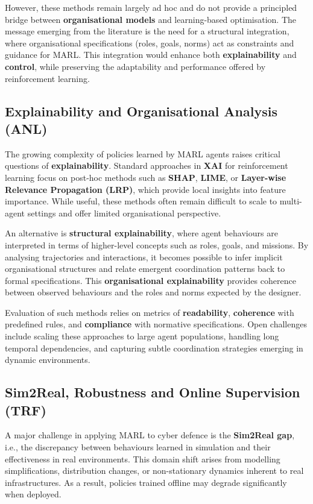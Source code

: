 \documentclass[a4paper,10pt,twocolumn]{article}
\begin{document}
However, these methods remain largely ad hoc and do not provide a
principled bridge between \textbf{organisational models} and
learning-based optimisation. The message emerging from the literature
is the need for a structural integration, where organisational
specifications (roles, goals, norms) act as constraints and guidance
for MARL. This integration would enhance both \textbf{explainability}
and \textbf{control}, while preserving the adaptability and performance
offered by reinforcement learning.

\subsection{Explainability and Organisational Analysis (ANL)}

The growing complexity of policies learned by MARL agents raises
critical questions of \textbf{explainability}. Standard approaches in
\textbf{XAI} for reinforcement learning focus on post-hoc methods such
as \textbf{SHAP}, \textbf{LIME}, or \textbf{Layer-wise Relevance
    Propagation (LRP)}, which provide local insights into feature
importance. While useful, these methods often remain difficult to scale
to multi-agent settings and offer limited organisational perspective.

An alternative is \textbf{structural explainability}, where agent
behaviours are interpreted in terms of higher-level concepts such as
roles, goals, and missions. By analysing trajectories and interactions,
it becomes possible to infer implicit organisational structures and
relate emergent coordination patterns back to formal specifications.
This \textbf{organisational explainability} provides coherence between
observed behaviours and the roles and norms expected by the designer.

Evaluation of such methods relies on metrics of \textbf{readability},
\textbf{coherence} with predefined rules, and \textbf{compliance} with
normative specifications. Open challenges include scaling these
approaches to large agent populations, handling long temporal
dependencies, and capturing subtle coordination strategies emerging
in dynamic environments.


\subsection{Sim2Real, Robustness and Online Supervision (TRF)}

A major challenge in applying MARL to cyber defence is the
\textbf{Sim2Real gap}, i.e., the discrepancy between behaviours learned
in simulation and their effectiveness in real environments. This domain
shift arises from modelling simplifications, distribution changes, or
non-stationary dynamics inherent to real infrastructures. As a result,
policies trained offline may degrade significantly when deployed.
\end{document}
